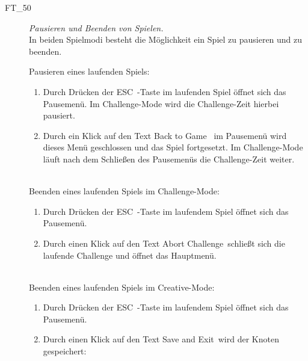 \begin{description}
	\item[FT\_50] \textit{Pausieren und Beenden von Spielen.}  \hfill\\
	
	In beiden Spielmodi besteht die Möglichkeit ein Spiel zu pausieren und zu beenden.
	
	Pausieren eines laufenden Spiels:

	\begin{enumerate} 
	
		\item Durch Drücken der \glqq ESC\grqq~-Taste im laufenden Spiel öffnet sich das Pausemenü. Im Challenge-Mode wird die Challenge-Zeit hierbei pausiert.
		
		\item Durch ein Klick auf den Text \glqq Back to Game\grqq~ im Pausemenü wird dieses Menü geschlossen und das Spiel fortgesetzt. Im Challenge-Mode läuft nach dem Schließen des Pausemenüs die Challenge-Zeit weiter.
		
	\end{enumerate}
	
\clearpage
	
	~\\Beenden eines laufenden Spiels im Challenge-Mode:

	\begin{enumerate} 
	
		\item Durch Drücken der \glqq ESC\grqq~-Taste im laufendem Spiel öffnet sich das Pausemenü.
		
		\item Durch einen Klick auf den Text  \glqq Abort Challenge\grqq~schließt sich die laufende Challenge und öffnet das Hauptmenü.
		
	\end{enumerate}
	
		~\\Beenden eines laufenden Spiels im Creative-Mode:

	\begin{enumerate} 
	
		\item Durch Drücken der \glqq ESC\grqq~-Taste im laufendem Spiel öffnet sich das Pausemenü.
		
		\item Durch einen Klick auf den Text \glqq Save and Exit\grqq~wird der Knoten gespeichert:
		
		\begin{itemize}
		

\end{itemize}
\end{enumerate}
\end{description}
